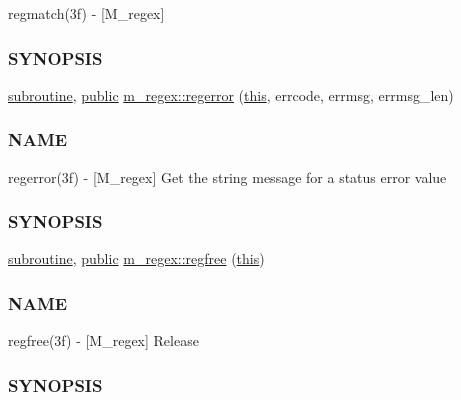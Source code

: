 \begin{DoxyCompactItemize}
\begin{DoxyCompactList}
regmatch(3f) -\/ \mbox{[}M\+\_\+regex\mbox{]} \subsubsection*{S\+Y\+N\+O\+P\+S\+IS}\end{DoxyCompactList}\item 
\hyperlink{M__stopwatch_83_8txt_acfbcff50169d691ff02d4a123ed70482}{subroutine}, \hyperlink{M__stopwatch_83_8txt_a2f74811300c361e53b430611a7d1769f}{public} \hyperlink{namespacem__regex_a7fe6dc1737cbfdf0bb8e1ddca2055a33}{m\+\_\+regex\+::regerror} (\hyperlink{M__stopwatch_83_8txt_ad62a52042bb610eee5b36b5516caec22}{this}, errcode, errmsg, errmsg\+\_\+len)
\begin{DoxyCompactList}\small\item\em \subsubsection*{N\+A\+ME}

regerror(3f) -\/ \mbox{[}M\+\_\+regex\mbox{]} Get the string message for a status error value \subsubsection*{S\+Y\+N\+O\+P\+S\+IS}\end{DoxyCompactList}\item 
\hyperlink{M__stopwatch_83_8txt_acfbcff50169d691ff02d4a123ed70482}{subroutine}, \hyperlink{M__stopwatch_83_8txt_a2f74811300c361e53b430611a7d1769f}{public} \hyperlink{namespacem__regex_a4e4e0028bd3eddc7b2444e90a2129b9e}{m\+\_\+regex\+::regfree} (\hyperlink{M__stopwatch_83_8txt_ad62a52042bb610eee5b36b5516caec22}{this})
\begin{DoxyCompactList}\small\item\em \subsubsection*{N\+A\+ME}

regfree(3f) -\/ \mbox{[}M\+\_\+regex\mbox{]} Release \subsubsection*{S\+Y\+N\+O\+P\+S\+IS}\end{DoxyCompactList}\end{DoxyCompactItemize}
